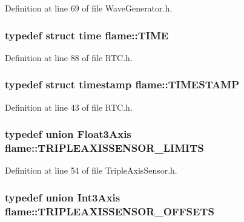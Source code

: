 Definition at line 69 of file Wave\-Generator.\-h.

\hypertarget{namespaceflame_a961fbb5da27b8d64aa0dfc18f55b2be6}{
\subsubsection[{T\-I\-M\-E}]{\setlength{\rightskip}{0pt plus 5cm}typedef struct {\bf time} {\bf flame\-::\-T\-I\-M\-E}}}\label{namespaceflame_a961fbb5da27b8d64aa0dfc18f55b2be6}


Definition at line 88 of file R\-T\-C.\-h.

\hypertarget{namespaceflame_ad90347e9ea7e54907966260ec5c7d22f}{
\subsubsection[{T\-I\-M\-E\-S\-T\-A\-M\-P}]{\setlength{\rightskip}{0pt plus 5cm}typedef struct {\bf timestamp} {\bf flame\-::\-T\-I\-M\-E\-S\-T\-A\-M\-P}}}\label{namespaceflame_ad90347e9ea7e54907966260ec5c7d22f}


Definition at line 43 of file R\-T\-C.\-h.

\hypertarget{namespaceflame_a2b796938428096c98b4073492baf98a6}{
\subsubsection[{T\-R\-I\-P\-L\-E\-A\-X\-I\-S\-S\-E\-N\-S\-O\-R\-\_\-\-L\-I\-M\-I\-T\-S}]{\setlength{\rightskip}{0pt plus 5cm}typedef union {\bf Float3\-Axis} {\bf flame\-::\-T\-R\-I\-P\-L\-E\-A\-X\-I\-S\-S\-E\-N\-S\-O\-R\-\_\-\-L\-I\-M\-I\-T\-S}}}\label{namespaceflame_a2b796938428096c98b4073492baf98a6}


Definition at line 54 of file Triple\-Axis\-Sensor.\-h.

\hypertarget{namespaceflame_a9c63ea08dcbcedfed611f6afdb992301}{
\subsubsection[{T\-R\-I\-P\-L\-E\-A\-X\-I\-S\-S\-E\-N\-S\-O\-R\-\_\-\-O\-F\-F\-S\-E\-T\-S}]{\setlength{\rightskip}{0pt plus 5cm}typedef union {\bf Int3\-Axis} {\bf flame\-::\-T\-R\-I\-P\-L\-E\-A\-X\-I\-S\-S\-E\-N\-S\-O\-R\-\_\-\-O\-F\-F\-S\-E\-T\-S}}}\label{namespaceflame_a9c63ea08dcbcedfed611f6afdb992301}


